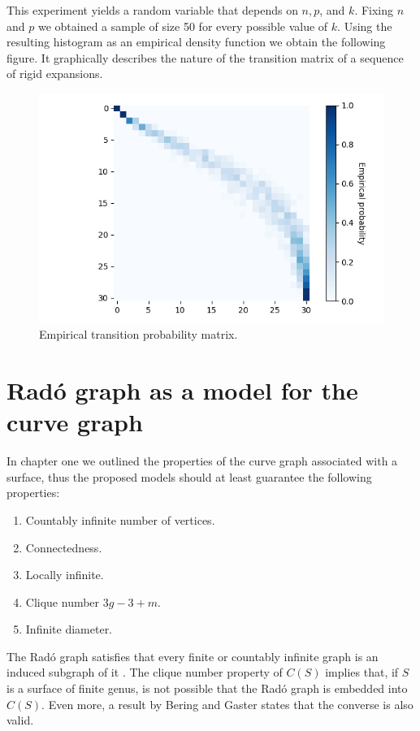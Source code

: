 This experiment yields a random variable that depends on $n, p$, and $k$. Fixing $n$ and $p$ we obtained a sample of size 50 for every possible value of $k$. Using the resulting histogram as an empirical density function we obtain the following figure. It graphically describes the nature of the transition matrix of a sequence of rigid expansions.

\begin{figure}[h!]
	\centering
	\includegraphics[scale=0.7]{Python/Figures/Transition-matrix-secuence-of-rigid-expansions.png}
	\caption{Empirical transition probability matrix.}
\end{figure}

\section{Radó graph as a model for the curve graph}

In chapter one we outlined the properties of the curve graph associated with a surface, thus the proposed models should at least guarantee the following properties:

\begin{enumerate}
\item Countably infinite number of vertices.
\item Connectedness.
\item Locally infinite.
\item Clique number $3g-3+m$.
\item Infinite diameter.
\end{enumerate}

The Radó graph satisfies that every finite or countably infinite graph is an induced subgraph of it \cite[Cameron 97]{theRandomGraph}. The clique number property of $C(S)$ implies that, if $S$ is a surface of finite genus, is not possible that the Radó graph is embedded into $C(S)$. Even more, a result by Bering and Gaster \cite[Bering, Gaster 17]{beringGaster} states that the converse is also valid.

